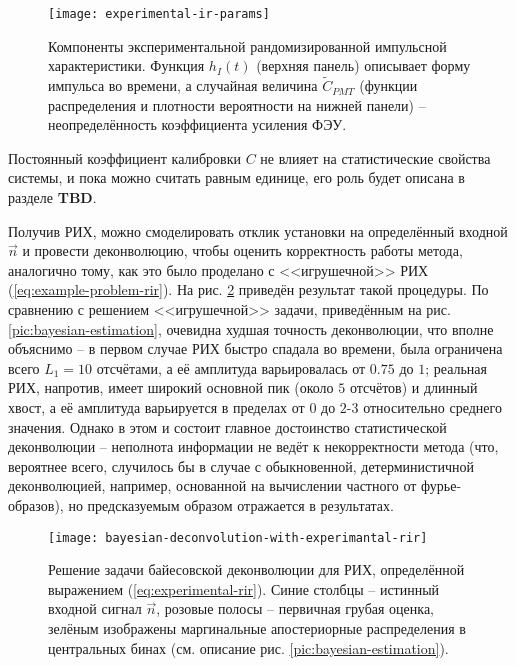 \begin{figure}
	\centering
	\texttt{[image: experimental-ir-params]}
	\caption{Компоненты экспериментальной рандомизированной импульсной характеристики. Функция $h_I(t)$ (верхняя панель) описывает форму импульса во времени, а случайная величина $\tilde{C}_{PMT}$ (функции распределения и плотности вероятности на нижней панели) -- неопределённость коэффициента усиления ФЭУ.}
	\label{pic:experimental-rir-params}
\end{figure}

Постоянный коэффициент калибровки $C$ не влияет на статистические свойства системы, и пока можно считать равным единице, его роль будет описана в разделе \textbf{TBD}.

Получив РИХ, можно смоделировать отклик установки на определённый входной $\vec{n}$ и провести деконволюцию, чтобы оценить корректность работы метода, аналогично тому, как это было проделано с <<игрушечной>> РИХ (\ref{eq:example-problem-rir}). На рис. \ref{pic:bayesian-deconvolution-with-experimantal-rir} приведён результат такой процедуры. По сравнению с решением <<игрушечной>> задачи, приведённым на рис. \ref{pic:bayesian-estimation}, очевидна худшая точность деконволюции, что вполне объяснимо -- в первом случае РИХ быстро спадала во времени, была ограничена всего $L_1=10$ отсчётами, а её амплитуда варьировалась от $0.75$ до $1$; реальная РИХ, напротив, имеет широкий основной пик (около $5$ отсчётов) и длинный хвост, а её амплитуда варьируется в пределах от $0$ до $2$-$3$  относительно среднего значения. Однако в этом и состоит главное достоинство статистической деконволюции -- неполнота информации не ведёт к некорректности метода (что, вероятнее всего, случилось бы в случае с обыкновенной, детерминистичной деконволюцией, например, основанной на вычислении частного от фурье-образов), но предсказуемым образом отражается в результатах.

\begin{figure}
	\centering
	\texttt{[image: bayesian-deconvolution-with-experimantal-rir]}
	\caption{Решение задачи байесовской деконволюции для РИХ, определённой выражением (\ref{eq:experimental-rir}). Синие столбцы -- истинный входной сигнал $\vec{n}$, розовые полосы -- первичная грубая оценка, зелёным изображены маргинальные апостериорные распределения в центральных бинах (см. описание рис. \ref{pic:bayesian-estimation}).}
	\label{pic:bayesian-deconvolution-with-experimantal-rir}
\end{figure}

